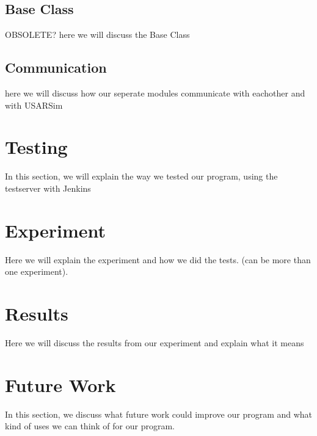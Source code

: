 \documentclass[a4paper,10pt]{article}
\begin{document}
\subsection{Base Class}
OBSOLETE? here we will discuss the Base Class

\subsection{Communication}
here we will discuss how our seperate modules communicate with eachother and with USARSim

\newpage

\section{Testing}
In this section, we will explain the way we tested our program, using the testserver with Jenkins

\newpage

\section{Experiment}
Here we will explain the experiment and how we did the tests. (can be more than one experiment).

\newpage

\section{Results}
Here we will discuss the results from our experiment and explain what it means

\newpage

\section{Future Work}
In this section, we discuss what future work could improve our program and what kind of uses we can think of for our program.
\end{document}
